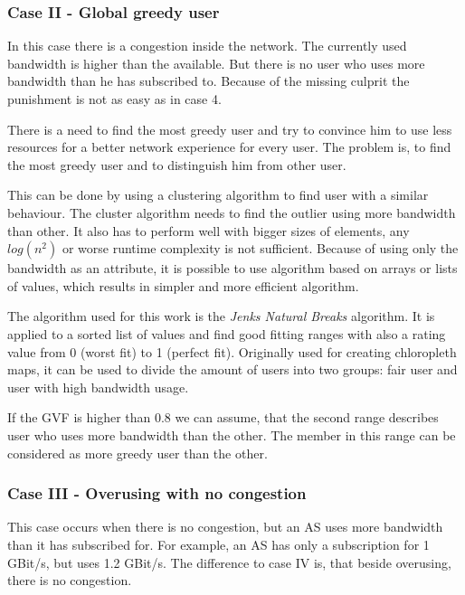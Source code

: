 \documentclass[thesis.tex]{subfiles}
\begin{document}
\subsubsection{Case II - Global greedy user}
In this case there is a congestion inside the network. The currently used bandwidth is higher than the available. But there is no user who uses more bandwidth than he has subscribed to. Because of the missing culprit the punishment is not as easy as in case 4.

There is a need to find the most greedy user and try to convince him to use less resources for a better network experience for every user. The problem is, to find the most greedy user and to distinguish him from other user.

This can be done by using a clustering algorithm to find user with a similar behaviour. The cluster algorithm needs to find the outlier using more bandwidth than other. It also has to perform well with bigger sizes of elements, any $log(n^2)$ or worse runtime complexity is not sufficient. Because of using only the bandwidth as an attribute, it is possible to use algorithm based on arrays or lists of values, which results in simpler and more efficient algorithm.

The algorithm used for this work is the \textit{Jenks Natural Breaks} algorithm. 
It is applied to a sorted list of values and find good fitting ranges with also a rating value from 0 (worst fit) to 1 (perfect fit). Originally used for creating chloropleth maps, it can be used to divide the amount of users into two groups: fair user and user with high bandwidth usage. 


If the GVF is higher than 0.8 we can assume, that the second range describes user who uses more bandwidth than the other. The member in this range can be considered as more greedy user than the other.



\subsubsection{Case III - Overusing with no congestion}
This case occurs when there is no congestion, but an AS uses more bandwidth than it has subscribed for. For example, an AS has only a subscription for 1 GBit/s, but uses 1.2 GBit/s. The difference to case IV is, that beside overusing, there is no congestion.
\end{document}
